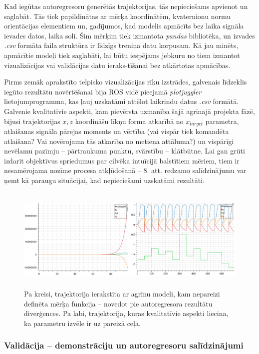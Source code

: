 \documentclass[12pt, a4paper]{article}
\numberwithin{equation}{section} %
\begin{document}
Kad iegūtas autoregresoru ģenerētās trajektorijas, tās nepieciešams apvienot un saglabāt. Tās tiek papildinātas ar mērķa koordinātēm, kvaternionu normu orientācijas elementiem un, gadījumos, kad modelis apmācīts bez laika signāla ievades datos, laika soli.  Šim mērķim tiek izmantota \textit{pandas} bibliotēka, un izvades \textit{.csv} formāta faila struktūra ir līdzīgs treniņa datu korpusam. Kā jau minēts, apmācītie modeļi tiek saglabāti, lai būtu iespējams jebkuru no tiem izmantot vizualizācijas vai validācijas datu ieraks-tīšanai bez atkārtotas apmācības. 

Pirms zemāk aprakstīto telpisko vizualizācijas rīku izstrādes, galvenais līdzeklis iegūto rezultātu novērtēšanai bija ROS vidē pieejamā \textit{plotjuggler} lietojumprogramma, kas ļauj uzskatāmi attēlot laikrindu datus \textit{.csv} formātā. Galvenie kvalitatīvie aspekti, kam pievērsta uzmanība šajā agrīnajā projekta fāzē, bijusi trajektorijas $x, z$ koordināšu līkņu forma atkarībā no $x_{target}$ parametra, atlaišanas signāla pārejas moments un vērtība (vai vispār tiek komandēta atlaišana? Vai novērojama tās atkarība no metiena attāluma?) un vispārīgi nevēlamu pazīmju -- pārtraukuma punktu, svārstību -- klātbūtne. Lai gan grūti izdarīt objektīvus spriedumus par cilvēka intuīcijā balstītiem mēriem, tiem ir nesamērojama nozīme procesa atkļūdošanā -- 8. att. redzamo salīdzinājumu var ņemt kā paraugu situācijai, kad nepieciešami uzskatāmi rezultāti.

\begin{figure}[t!]
    \centering
    \includegraphics[height=5cm,page=1]{../img/qualitative_plots.png}
    \caption{Pa kreisi, trajektorija ierakstīta ar agrīnu modeli, kam nepareizi definēta mērķa funkcija -- novedot pie autoregresora rezultātu diverģences. Pa labi, trajektorija, kuras kvalitatīvie aspekti liecina, ka parametru izvēle ir uz pareizā ceļa.}
\end{figure}

\subsubsection{Validācija -- demonstrāciju un autoregresoru salīdzinājumi}
\end{document}
